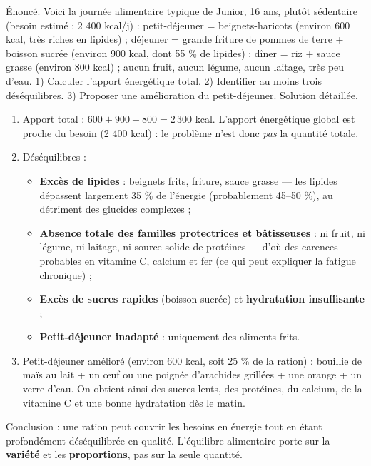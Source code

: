 \documentclass[11pt]{article}
\begin{document}
\begin{exoresolu}
Énoncé. Voici la journée alimentaire typique de Junior, 16 ans, plutôt sédentaire (besoin estimé : 2 400 kcal/j) : petit-déjeuner = beignets-haricots (environ 600 kcal, très riches en lipides) ; déjeuner = grande friture de pommes de terre + boisson sucrée (environ 900 kcal, dont 55 \% de lipides) ; dîner = riz + sauce grasse (environ 800 kcal) ; aucun fruit, aucun légume, aucun laitage, très peu d'eau. 1) Calculer l'apport énergétique total. 2) Identifier au moins trois déséquilibres. 3) Proposer une amélioration du petit-déjeuner.
\tcblower
Solution détaillée.
\begin{enumerate}
\item Apport total : $600 + 900 + 800 = 2\,300$ kcal. L'apport énergétique global est proche du besoin (2 400 kcal) : le problème n'est donc \emph{pas} la quantité totale.
\item Déséquilibres :
\begin{itemize}
\item \textbf{Excès de lipides} : beignets frits, friture, sauce grasse — les lipides dépassent largement 35 \% de l'énergie (probablement 45--50 \%), au détriment des glucides complexes ;
\item \textbf{Absence totale des familles protectrices et bâtisseuses} : ni fruit, ni légume, ni laitage, ni source solide de protéines — d'où des carences probables en vitamine C, calcium et fer (ce qui peut expliquer la fatigue chronique) ;
\item \textbf{Excès de sucres rapides} (boisson sucrée) et \textbf{hydratation insuffisante} ;
\item \textbf{Petit-déjeuner inadapté} : uniquement des aliments frits.
\end{itemize}
\item Petit-déjeuner amélioré (environ 600 kcal, soit 25 \% de la ration) : bouillie de maïs au lait + un œuf ou une poignée d'arachides grillées + une orange + un verre d'eau. On obtient ainsi des sucres lents, des protéines, du calcium, de la vitamine C et une bonne hydratation dès le matin.
\end{enumerate}
Conclusion : une ration peut couvrir les besoins en énergie tout en étant profondément déséquilibrée en qualité. L'équilibre alimentaire porte sur la \textbf{variété} et les \textbf{proportions}, pas sur la seule quantité.
\end{exoresolu}
\end{document}
